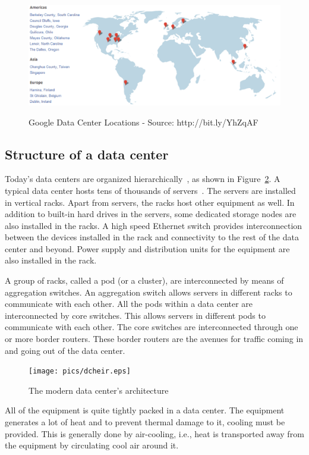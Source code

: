 \begin{figure}
\includegraphics[width=1\textwidth]{pics/googledcmap2.eps}
\label{fig:googledcmap}
\caption{Google Data Center Locations - Source: http://bit.ly/YhZqAF}
\end{figure}

\subsection{Structure of a data center} Today's data centers are organized hierarchically~\cite{dcnetworking:vahdat:micro:2010}, as shown in Figure~\ref{fig:dcheir}. A typical data center hosts tens of thousands of servers~\cite{Abts:2012:GTD:2184319.2184335}. The servers are installed in vertical racks. Apart from servers, the racks host other equipment as well. In addition to built-in hard drives in the servers, some dedicated storage nodes are also installed in the racks. A high speed Ethernet switch provides interconnection between the devices installed in the rack and connectivity to the rest of the data center and beyond. Power supply and distribution units for the equipment are also installed in the rack. 

A group of racks, called a pod (or a cluster), are interconnected by means of aggregation switches. An aggregation switch allows servers in different racks to communicate with each other. All the pods within a data center are interconnected by core switches. This allows servers in different pods to communicate with each other. The core switches are interconnected through one or more border routers. These border routers are the avenues for traffic coming in and going out of the data center. 

\begin{figure}
\texttt{[image: pics/dcheir.eps]}
\caption{The modern data center's architecture}
\label{fig:dcheir}
\end{figure}

All of the equipment is quite tightly packed in a data center. The equipment generates a lot of heat and to prevent thermal damage to it, cooling must be provided. This is generally done by air-cooling, i.e., heat is transported away from the equipment by circulating cool air around it.

